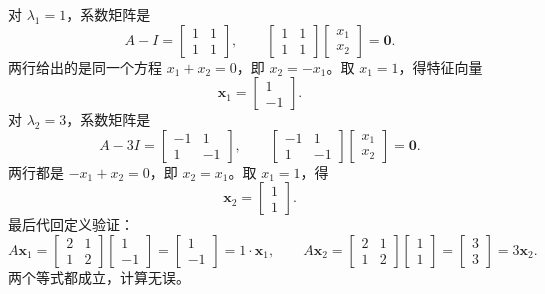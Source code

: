 \documentclass[UTF8,a4paper,12pt]{ctexart}
\numberwithin{equation}{section}
\begin{document}
	对 $\lambda_1=1$，系数矩阵是
	\begin{equation}\label{eq:7.9}
	A-I=
	\begin{bmatrix}
		1&1\\
		1&1
	\end{bmatrix},
	\qquad
	\begin{bmatrix}
		1&1\\
		1&1
	\end{bmatrix}
	\begin{bmatrix}
		x_1\\
		x_2
	\end{bmatrix}
	=\bm{0}.
	\end{equation}
	两行给出的是同一个方程 $x_1+x_2=0$，即 $x_2=-x_1$。取 $x_1=1$，得特征向量
	\begin{equation}\label{eq:7.10}
	\bm{x}_1=
	\begin{bmatrix}
		1\\
		-1
	\end{bmatrix}.
	\end{equation}
	对 $\lambda_2=3$，系数矩阵是
	\begin{equation}\label{eq:7.11}
	A-3I=
	\begin{bmatrix}
		-1&1\\
		1&-1
	\end{bmatrix},
	\qquad
	\begin{bmatrix}
		-1&1\\
		1&-1
	\end{bmatrix}
	\begin{bmatrix}
		x_1\\
		x_2
	\end{bmatrix}
	=\bm{0}.
	\end{equation}
	两行都是 $-x_1+x_2=0$，即 $x_2=x_1$。取 $x_1=1$，得
	\begin{equation}\label{eq:7.12}
	\bm{x}_2=
	\begin{bmatrix}
		1\\
		1
	\end{bmatrix}.
	\end{equation}
	最后代回定义验证：
	\begin{equation}\label{eq:7.13}
	A\bm{x}_1=
	\begin{bmatrix}
		2&1\\
		1&2
	\end{bmatrix}
	\begin{bmatrix}
		1\\
		-1
	\end{bmatrix}
	=
	\begin{bmatrix}
		1\\
		-1
	\end{bmatrix}
	=1\cdot\bm{x}_1,
	\qquad
	A\bm{x}_2=
	\begin{bmatrix}
		2&1\\
		1&2
	\end{bmatrix}
	\begin{bmatrix}
		1\\
		1
	\end{bmatrix}
	=
	\begin{bmatrix}
		3\\
		3
	\end{bmatrix}
	=3\bm{x}_2.
	\end{equation}
	两个等式都成立，计算无误。
\end{document}
